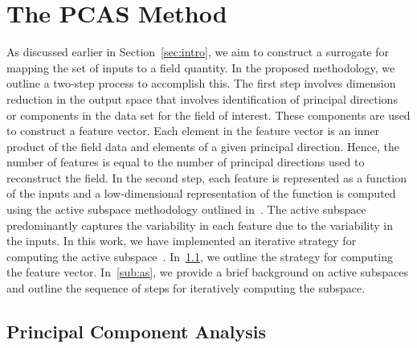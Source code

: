 \section{The PCAS Method}
\label{sec:method}

As discussed earlier in Section~\ref{sec:intro}, we aim to construct a surrogate for mapping the set of inputs to a
field quantity. In the proposed methodology, we outline a two-step process to accomplish this. The first step involves
dimension reduction in the output space that involves
identification of principal directions or components in the data set for the field of interest. These components are used
to construct a feature vector. Each element in the feature vector is an inner product of the field data and elements
of a given principal direction. Hence, the number of features is equal to the number of principal directions used to
reconstruct the field. In the second step, each feature is represented as a function of the inputs and a low-dimensional
representation of the function is computed
using the active subspace methodology outlined in~\cite{Constantine:2015}. The active subspace predominantly
captures the variability in each feature due to the variability in the inputs. 
In this work, we have implemented an iterative strategy for computing the active subspace~\cite{Vohra:2019}. 
In~\ref{sub:pca}, we outline
the strategy for computing the feature vector. In~\ref{sub:as}, we provide a brief background on active subspaces
and outline the sequence of steps for iteratively computing the subspace. 

\subsection{Principal Component Analysis}
\label{sub:pca}

